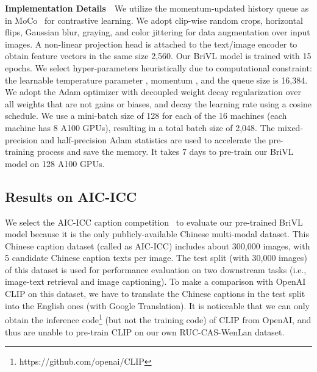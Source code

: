 \documentclass[10pt,twocolumn,letterpaper]{article}
\begin{document}
\noindent\textbf{Implementation Details}~~We utilize the momentum-updated history queue as in MoCo~\cite{he2020momentum} for contrastive learning.
We adopt clip-wise random crops, horizontal flips, Gaussian blur, graying, and color jittering for data augmentation over input images. A non-linear projection head is attached to the text/image encoder to obtain feature vectors in the same size 2,560. Our BriVL model is trained with 15 epochs. We select hyper-parameters heuristically due to computational constraint: the learnable temperature parameter , momentum , and the queue size is 16,384. We adopt the Adam optimizer with decoupled weight decay regularization over all weights that are not gains or biases, and decay the learning rate using a cosine schedule. We use a mini-batch size of 128 for each of the 16 machines (each machine has 8 A100 GPUs), resulting in a total batch size of 2,048. The mixed-precision and half-precision Adam statistics are used to accelerate the pre-training process and save the memory. It takes 7 days to pre-train our BriVL model on 128 A100 GPUs.

\subsection{Results on AIC-ICC}

We select the AIC-ICC caption competition~\cite{wu2017ai} to evaluate our pre-trained BriVL model because it is the only publicly-available Chinese multi-modal dataset. This Chinese caption dataset (called as AIC-ICC) includes about 300,000 images, with 5 candidate Chinese caption texts per image. The test split (with 30,000 images) of this dataset is used for performance evaluation on two downstream tasks (i.e., image-text retrieval and image captioning). To make a comparison with OpenAI CLIP on this dataset, we have to translate the Chinese captions in the test split into the English ones (with Google Translation). It is noticeable that we can only obtain the inference code\footnote{https://github.com/openai/CLIP} (but not the training code) of CLIP from OpenAI, and thus are unable to pre-train CLIP on our own RUC-CAS-WenLan dataset. 
\end{document}
